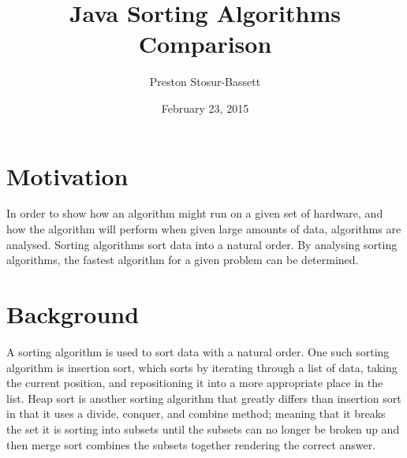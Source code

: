\documentclass[onecolumn, 12pt, article]{IEEEtran}
\numberwithin{case}{problem}
\numberwithin{condition}{problem}
\numberwithin{condition}{subsection}
\numberwithin{definition}{section}
\theoremstyle{remark}
\numberwithin{question}{problem}
\theoremstyle{plain}
\numberwithin{answer}{problem}
\numberwithin{solution}{section}
\numberwithin{equation}{section}%
\begin{document}
\title{Java Sorting Algorithms Comparison}
\author{Preston Stosur-Bassett}
\date{February 23, 2015}
\maketitle

\pagestyle{fancy}

\begin{abstract}

\end{abstract}

\section{Motivation}
In order to show how an algorithm might run on a given set of hardware, and how the algorithm will perform when given large amounts of data, algorithms are analysed. Sorting algorithms sort data into a natural order. By analysing sorting algorithms, the fastest algorithm for a given problem can be determined. 

\section{Background}
A sorting algorithm is used to sort data with a natural order. One such sorting algorithm is insertion sort, which sorts by iterating through a list of data, taking the current position, and repositioning it into a more appropriate place in the list. Heap sort is another sorting algorithm that greatly differs than insertion sort in that it uses a divide, conquer, and combine method; meaning that it breaks the set it is sorting into subsets until the subsets can no longer be broken up and then merge sort combines the subsets together rendering the correct answer. %

\end{document}
